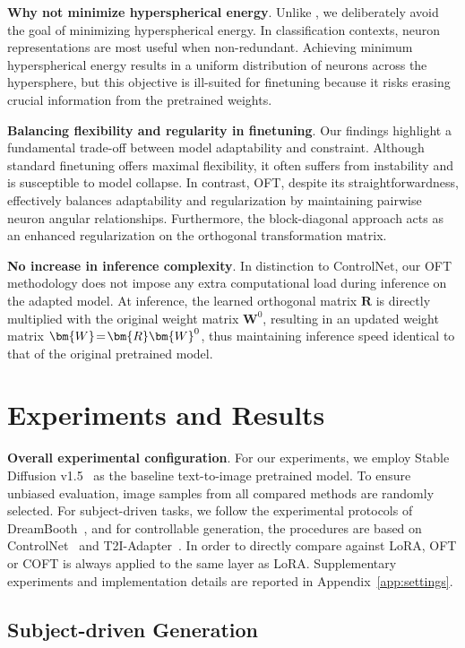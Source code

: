 \textbf{Why not minimize hyperspherical energy}. Unlike \cite{liu2021orthogonal}, we deliberately avoid the goal of minimizing hyperspherical energy. In classification contexts, neuron representations are most useful when non-redundant. Achieving minimum hyperspherical energy results in a uniform distribution of neurons across the hypersphere, but this objective is ill-suited for finetuning because it risks erasing crucial information from the pretrained weights.

\textbf{Balancing flexibility and regularity in finetuning}. Our findings highlight a fundamental trade-off between model adaptability and constraint. Although standard finetuning offers maximal flexibility, it often suffers from instability and is susceptible to model collapse. In contrast, OFT, despite its straightforwardness, effectively balances adaptability and regularization by maintaining pairwise neuron angular relationships. Furthermore, the block-diagonal approach acts as an enhanced regularization on the orthogonal transformation matrix.

\textbf{No increase in inference complexity}. In distinction to ControlNet, our OFT methodology does not impose any extra computational load during inference on the adapted model. At inference, the learned orthogonal matrix $\bm{R}$ is directly multiplied with the original weight matrix $\bm{W}^0$, resulting in an updated weight matrix $\thickmuskip=2mu \medmuskip=2mu \bm{W}=\bm{R}\bm{W}^0$, thus maintaining inference speed identical to that of the original pretrained model.

\section{Experiments and Results}

\textbf{Overall experimental configuration}. For our experiments, we employ Stable Diffusion v1.5~\cite{rombach2022high} as the baseline text-to-image pretrained model. To ensure unbiased evaluation, image samples from all compared methods are randomly selected. For subject-driven tasks, we follow the experimental protocols of DreamBooth~\cite{ruiz2023dreambooth}, and for controllable generation, the procedures are based on ControlNet~\cite{zhang2023adding} and T2I-Adapter~\cite{mou2023t2i}. In order to directly compare against LoRA, OFT or COFT is always applied to the same layer as LoRA. Supplementary experiments and implementation details are reported in Appendix~\ref{app:settings}.

\subsection{Subject-driven Generation}

